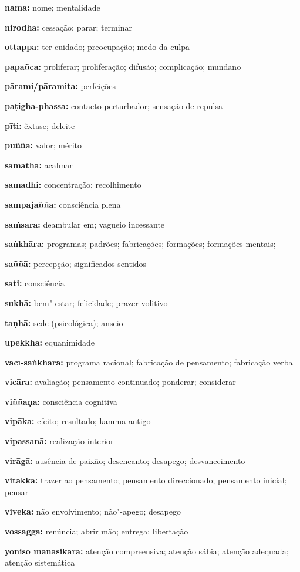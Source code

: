 \textbf{nāma:} nome; mentalidade

\textbf{nirodhā:} cessação; parar; terminar

\textbf{ottappa:} ter cuidado; preocupação; medo da culpa

\textbf{papañca:} proliferar; proliferação; difusão; complicação; mundano

\textbf{pārami/pāramita:} perfeições

\textbf{paṭigha-phassa:} contacto perturbador; sensação de repulsa

\textbf{pīti:} êxtase; deleite

\textbf{puñña:} valor; mérito

\textbf{samatha:} acalmar

\textbf{samādhi:} concentração; recolhimento

\textbf{sampajañña:} consciência plena

\textbf{saṁsāra:} deambular em; vagueio incessante

\textbf{saṅkhāra:} programas; padrões; fabricações; formações; formações mentais;

\textbf{saññā:} percepção; significados sentidos

\textbf{sati:} consciência

\textbf{sukhā:} bem"-estar; felicidade; prazer volitivo

\textbf{taṇhā:} sede (psicológica); anseio

\textbf{upekkhā:} equanimidade

\textbf{vacī-saṅkhāra:} programa racional; fabricação de pensamento; fabricação verbal

\textbf{vicāra:} avaliação; pensamento continuado; ponderar; considerar

\textbf{viññaṇa:} consciência cognitiva

\textbf{vipāka:} efeito; resultado; kamma antigo

\textbf{vipassanā:} realização interior

\textbf{virāgā:} ausência de paixão; desencanto; desapego; desvanecimento

\textbf{vitakkā:} trazer ao pensamento; pensamento direccionado; pensamento inicial; pensar

\textbf{viveka:} não envolvimento; não"-apego; desapego

\textbf{vossagga:} renúncia; abrir mão; entrega; libertação

\textbf{yoniso manasikārā:} atenção compreensiva; atenção sábia; atenção adequada; atenção sistemática

\setlength{\parskip}{5pt}
